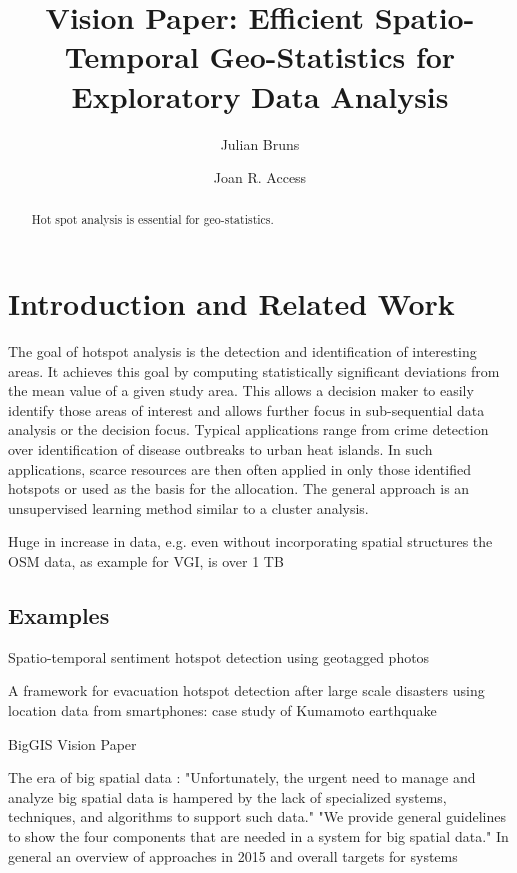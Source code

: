 \documentclass[a4paper,UKenglish]{lipics-v2016}
\title{Vision Paper: Efficient Spatio-Temporal Geo-Statistics for Exploratory Data Analysis}
\author[1]{Julian Bruns}
\author[1]{Joan R. Access}
\affil[1]{GIScience Research Group, Institute of Geography, Heidelberg University, Heidelberg, Germany\\
  \texttt{firstname.lastname@uni-heidelberg.de}}
\begin{document}
\maketitle



\begin{abstract}
Hot spot analysis is essential for geo-statistics.

\end{abstract}


\section{Introduction and Related Work}
The goal of hotspot analysis is the detection and identification of interesting areas. It achieves this goal by computing statistically significant deviations from the mean value of a given study area. This allows a decision maker to easily identify those areas of interest and allows further focus in sub-sequential data analysis or the decision focus. Typical applications range from crime detection over identification of disease outbreaks to urban heat islands. In such applications, scarce resources are then often applied in only those identified hotspots or used as the basis for the allocation. The general approach is an unsupervised learning method similar to a cluster analysis. 

Huge in increase in data, e.g. even without incorporating spatial structures the OSM\cite{OpenStreetMap} data, as example for VGI, is over 1 TB


\subsection{Examples}


Spatio-temporal sentiment hotspot detection using geotagged photos \cite{Zhu:2016:SSH:2996913.2996978}

A framework for evacuation hotspot detection after large scale disasters using location data from smartphones: case study of Kumamoto earthquake \cite {Yabe:2016:FEH:2996913.2997014}

\cite{Wiener:2016:BCR:2996913.2996931} BigGIS Vision Paper

\cite{7129542} The era of big spatial data : 
"Unfortunately, the urgent need to manage and analyze big
spatial data is hampered by the lack of specialized systems,
techniques, and algorithms to support such data." "We
provide general guidelines to show the four components that
are needed in a system for big spatial data." 
In general an overview of approaches in 2015 and overall targets for systems
\end{document}
